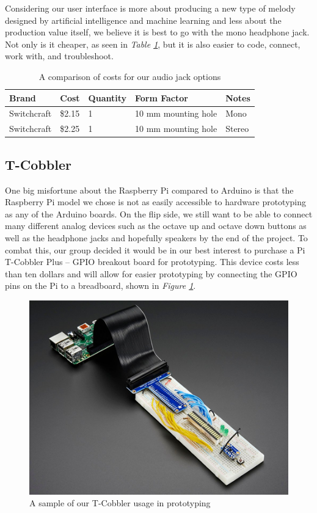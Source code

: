 Considering our user interface is more about producing a new type of melody designed by artificial intelligence and machine learning and less about the production value itself, we believe it is best to go with the mono headphone jack. Not only is it cheaper, as seen in \textit{Table \ref{Tab:jack_brand}}, but it is also easier to code, connect, work with, and troubleshoot.

\begin{table}[]
  \centering
  \begin{tabular}{|l|l|l|l|l|}
    \hline
    Brand       & Cost   & Quantity & Form Factor         & Notes  \\ \hline
    Switchcraft & \$2.15 & 1        & 10 mm mounting hole & Mono   \\ \hline
    Switchcraft & \$2.25 & 1        & 10 mm mounting hole & Stereo \\ \hline
  \end{tabular}
  \caption{A comparison of costs for our audio jack options}
  \label{Tab:jack_brand}
\end{table}

\subsection{T-Cobbler}

One big misfortune about the Raspberry Pi compared to Arduino is that the Raspberry Pi model we chose is not as easily accessible to hardware prototyping as any of the Arduino boards. On the flip side, we still want to be able to connect many different analog devices such as the octave up and octave down buttons as well as the headphone jacks and hopefully speakers by the end of the project. To combat this, our group decided it would be in our best interest to purchase a Pi T-Cobbler Plus -- GPIO breakout board for prototyping. This device costs less than ten dollars and will allow for easier prototyping by connecting the GPIO pins on the Pi to a breadboard, shown in \textit{Figure \ref{fig:tcobbler}}.

\begin{figure}[h!]
  \centering
  \includegraphics[width=\linewidth]{image/TCobbler.png}
  \caption{A sample of our T-Cobbler usage in prototyping}
  \label{fig:tcobbler}
\end{figure}
\newpage


